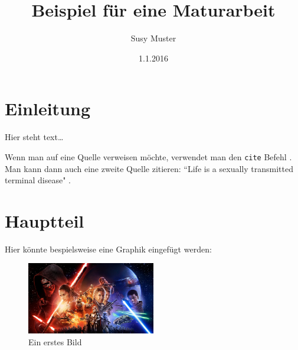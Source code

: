 \documentclass[12pt,a4paper]{article} %
\title{Beispiel für eine Maturarbeit}
\date{1.1.2016}
\author{Susy Muster}
\begin{document}
\maketitle %
% 











\newpage %
\tableofcontents %











\newpage


\section{Einleitung}
Hier steht text\ldots 

Wenn man auf eine Quelle verweisen möchte, verwendet man den \texttt{cite} Befehl \cite{buch1}. Man kann dann auch eine zweite Quelle zitieren: ``Life is a sexually transmitted terminal disease" \cite{buch2}.

\newpage



\section{Hauptteil}

Hier könnte bespielsweise eine Graphik eingefügt werden:

\begin{figure}[h] %
\centering %
\includegraphics[width=0.5\textwidth]{star_wars.jpeg} %
\caption{Ein erstes Bild \cite{sw16}}
\end{figure}
\end{document}
